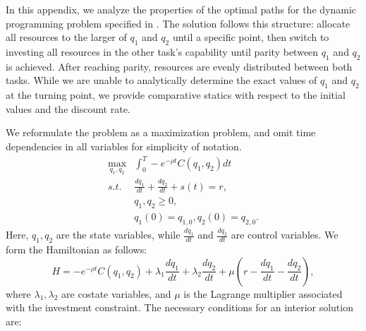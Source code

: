 \documentclass{article}
\theoremstyle{plain}
\theoremstyle{plain}
\begin{document}
In this appendix, we analyze the properties of the optimal paths for the dynamic programming problem specified in \pageref{eq:dp_problem}.
The solution follows this structure: allocate all resources to the larger of $q_{1}$ and $q_{2}$ until a specific point, then switch to investing all resources in the other task’s capability until parity between $q_{1}$ and $q_{2}$ is achieved. 
After reaching parity, resources are evenly distributed between both tasks. 
While we are unable to analytically determine the exact values of $q_{1}$ and $q_{2}$ at the turning point, we provide comparative statics with respect to the initial values and the discount rate.

We reformulate the problem as a maximization problem, and omit time dependencies in all variables for simplicity of notation.
\begin{align*}
\max_{q_{1},q_{2}} & \int_{0}^{T}-e^{-\rho t}C(q_{1},q_{2})dt\\
s.t. & \frac{dq_{1}}{dt}+\frac{dq_{2}}{dt}+s(t)=r,\\
 & q_{1},q_{2}\geq0,\\
 & q_{1}(0)=q_{1,0},q_{2}(0)=q_{2,0}.
\end{align*}
Here, $q_{1},q_{2}$ are the state variables, while $\frac{dq_{1}}{dt}$ and $\frac{dq_{2}}{dt}$ are control variables. 
We form the Hamiltonian as follows: 
\[
H=-e^{-\rho t}C(q_{1},q_{2})+\lambda_{1}\frac{dq_{1}}{dt}+\lambda_{2}\frac{dq_{2}}{dt}+\mu\left(r-\frac{dq_{1}}{dt}-\frac{dq_{2}}{dt}\right),
\]
where $\lambda_{1},\lambda_{2}$ are costate variables, and $\mu$ is the Lagrange multiplier associated with the investment constraint.
The necessary conditions for an interior solution are: %
\end{document}
